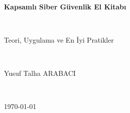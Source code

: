 \documentclass[12pt,a4paper,twoside]{book}
\newcommand{\KitapBaslik}{Kapsamlı Siber Güvenlik El Kitabı}
\newcommand{\KitapAltBaslik}{Teori, Uygulama ve En İyi Pratikler}
\newcommand{\YazarAdi}{Yusuf Talha ARABACI}
\begin{document}
\begin{titlepage}
  \centering
  \vspace*{3cm}
  {\Huge\bfseries \KitapBaslik \par}
  \vspace{0.5cm}
  {\Large \KitapAltBaslik \par}
  \vfill
  {\Large \YazarAdi \par}
  \vspace{1cm}
  {\large \today \par}
\end{titlepage}

\frontmatter
\tableofcontents

\mainmatter
















\backmatter
\end{document}
